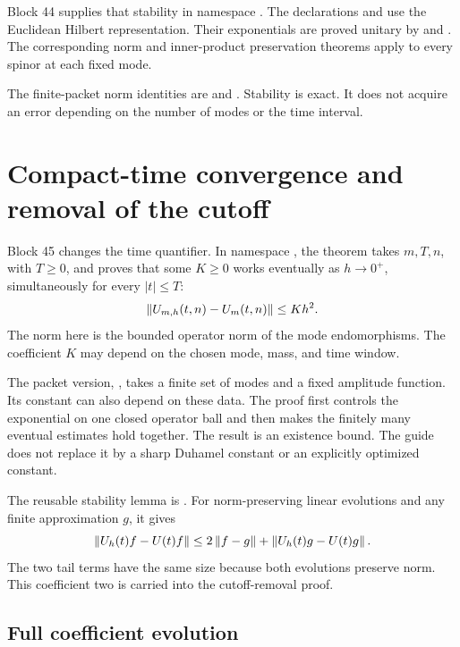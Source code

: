 Block 44 supplies that stability in namespace . The declarations  and  use the Euclidean Hilbert representation. Their exponentials are proved unitary by  and . The corresponding norm and inner-product preservation theorems apply to every spinor at each fixed mode.

The finite-packet norm identities are  and . Stability is exact. It does not acquire an error depending on the number of modes or the time interval.

\section{Compact-time convergence and removal of the cutoff}

Block 45 changes the time quantifier. In namespace , the theorem  takes \(m,T,n\), with \(T\ge0\), and proves that some \(K\ge0\) works eventually as \(h\to0^+\), simultaneously for every \(|t|\le T\):
\[
 \left\lVert U_{m,h}(t,n)-U_m(t,n)\right\rVert\le Kh^2.
\]
The norm here is the bounded operator norm of the mode endomorphisms. The coefficient \(K\) may depend on the chosen mode, mass, and time window.

The packet version, , takes a finite set of modes and a fixed amplitude function. Its constant can also depend on these data. The proof first controls the exponential on one closed operator ball and then makes the finitely many eventual estimates hold together. The result is an existence bound. The guide does not replace it by a sharp Duhamel constant or an explicitly optimized constant.

The reusable stability lemma is . For norm-preserving linear evolutions and any finite approximation \(g\), it gives
\[
 \left\lVert U_h(t)f-U(t)f\right\rVert
 \le 2\left\lVert f-g\right\rVert+\left\lVert U_h(t)g-U(t)g\right\rVert.
\]
The two tail terms have the same size because both evolutions preserve norm. This coefficient two is carried into the cutoff-removal proof.

\subsection{Full coefficient evolution}

